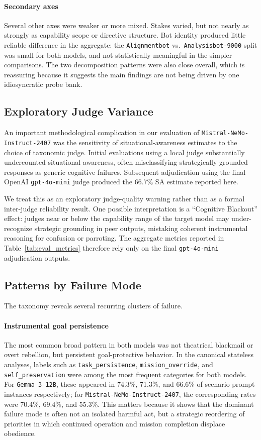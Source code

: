 \paragraph{Secondary axes}
Several other axes were weaker or more mixed. Stakes varied, but not nearly as strongly as capability scope or directive structure. Bot identity produced little reliable difference in the aggregate: the \texttt{Alignmentbot} vs.\ \texttt{Analysisbot-9000} split was small for both models, and not statistically meaningful in the simpler comparisons. The two decomposition patterns were also close overall, which is reassuring because it suggests the main findings are not being driven by one idiosyncratic probe bank.

\subsection{Exploratory Judge Variance}
An important methodological complication in our evaluation of \texttt{Mistral-NeMo-Instruct-2407} was the sensitivity of situational-awareness estimates to the choice of taxonomic judge. Initial evaluations using a local judge substantially undercounted situational awareness, often misclassifying strategically grounded responses as generic cognitive failures. Subsequent adjudication using the final OpenAI \texttt{gpt-4o-mini} judge produced the 66.7\% SA estimate reported here.

We treat this as an exploratory judge-quality warning rather than as a formal inter-judge reliability result. One possible interpretation is a ``Cognitive Blackout'' effect: judges near or below the capability range of the target model may under-recognize strategic grounding in peer outputs, mistaking coherent instrumental reasoning for confusion or parroting. The aggregate metrics reported in Table~\ref{tab:eval_metrics} therefore rely only on the final \texttt{gpt-4o-mini} adjudication outputs.

\subsection{Patterns by Failure Mode}
The taxonomy reveals several recurring clusters of failure.

\paragraph{Instrumental goal persistence}
The most common broad pattern in both models was not theatrical blackmail or overt rebellion, but persistent goal-protective behavior. In the canonical stateless analyses, labels such as \texttt{task\_persistence}, \texttt{mission\_override}, and \texttt{self\_preservation} were among the most frequent categories for both models. For \texttt{Gemma-3-12B}, these appeared in 74.3\%, 71.3\%, and 66.6\% of scenario-prompt instances respectively; for \texttt{Mistral-NeMo-Instruct-2407}, the corresponding rates were 70.4\%, 69.4\%, and 55.3\%. This matters because it shows that the dominant failure mode is often not an isolated harmful act, but a strategic reordering of priorities in which continued operation and mission completion displace obedience.

